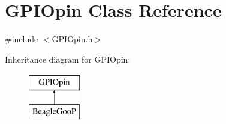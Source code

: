 \hypertarget{class_g_p_i_opin}{\section{G\-P\-I\-Opin Class Reference}
\label{class_g_p_i_opin}
}


{\ttfamily \#include $<$G\-P\-I\-Opin.\-h$>$}

Inheritance diagram for G\-P\-I\-Opin\-:\begin{figure}[H]
\begin{center}
\leavevmode
\includegraphics[height=2.000000cm]{class_g_p_i_opin}
\end{center}
\end{figure}
